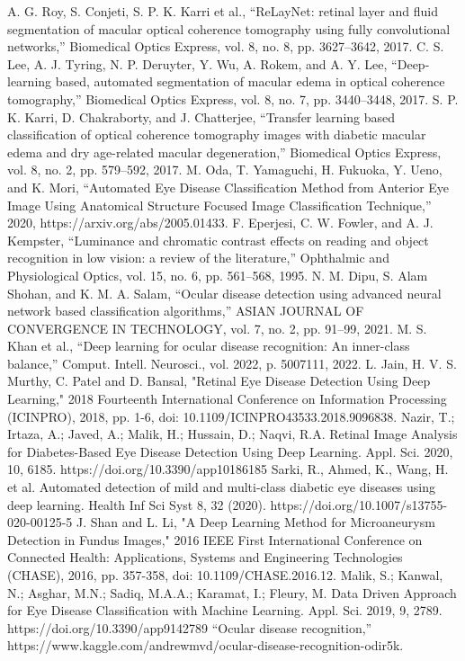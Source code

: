 \documentclass[12pt,a4paper,twoside,openright]{report}
\begin{document}
\begin{thebibliography}{00}
A. G. Roy, S. Conjeti, S. P. K. Karri et al., “ReLayNet: retinal layer and fluid segmentation of macular optical coherence tomography using fully convolutional networks,” Biomedical Optics Express, vol. 8, no. 8, pp. 3627–3642, 2017.
C. S. Lee, A. J. Tyring, N. P. Deruyter, Y. Wu, A. Rokem, and A. Y. Lee, “Deep-learning based, automated segmentation of macular edema in optical coherence tomography,” Biomedical Optics Express, vol. 8, no. 7, pp. 3440–3448, 2017.
S. P. K. Karri, D. Chakraborty, and J. Chatterjee, “Transfer learning based classification of optical coherence tomography images with diabetic macular edema and dry age-related macular degeneration,” Biomedical Optics Express, vol. 8, no. 2, pp. 579–592, 2017.
M. Oda, T. Yamaguchi, H. Fukuoka, Y. Ueno, and K. Mori, “Automated Eye Disease Classification Method from Anterior Eye Image Using Anatomical Structure Focused Image Classification Technique,” 2020, https://arxiv.org/abs/2005.01433.
F. Eperjesi, C. W. Fowler, and A. J. Kempster, “Luminance and chromatic contrast effects on reading and object recognition in low vision: a review of the literature,” Ophthalmic and Physiological Optics, vol. 15, no. 6, pp. 561–568, 1995.
N. M. Dipu, S. Alam Shohan, and K. M. A. Salam, “Ocular disease detection using advanced neural network based classification algorithms,” ASIAN JOURNAL OF CONVERGENCE IN TECHNOLOGY, vol. 7, no. 2, pp. 91–99, 2021.
M. S. Khan et al., “Deep learning for ocular disease recognition: An inner-class balance,” Comput. Intell. Neurosci., vol. 2022, p. 5007111, 2022.
 L. Jain, H. V. S. Murthy, C. Patel and D. Bansal, "Retinal Eye Disease Detection Using Deep Learning," 2018 Fourteenth International Conference on Information Processing (ICINPRO), 2018, pp. 1-6, doi: 10.1109/ICINPRO43533.2018.9096838.
 Nazir, T.; Irtaza, A.; Javed, A.; Malik, H.; Hussain, D.; Naqvi, R.A. Retinal Image Analysis for Diabetes-Based Eye Disease Detection Using Deep Learning. Appl. Sci. 2020, 10, 6185. https://doi.org/10.3390/app10186185
Sarki, R., Ahmed, K., Wang, H. et al. Automated detection of mild and multi-class diabetic eye diseases using deep learning. Health Inf Sci Syst 8, 32 (2020). https://doi.org/10.1007/s13755-020-00125-5
 J. Shan and L. Li, "A Deep Learning Method for Microaneurysm Detection in Fundus Images," 2016 IEEE First International Conference on Connected Health: Applications, Systems and Engineering Technologies (CHASE), 2016, pp. 357-358, doi: 10.1109/CHASE.2016.12.
 Malik, S.; Kanwal, N.; Asghar, M.N.; Sadiq, M.A.A.; Karamat, I.; Fleury, M. Data Driven Approach for Eye Disease Classification with Machine Learning. Appl. Sci. 2019, 9, 2789. https://doi.org/10.3390/app9142789
 “Ocular disease recognition,” https://www.kaggle.com/andrewmvd/ocular-disease-recognition-odir5k.
\end{thebibliography}
\vspace{12pt}
\end{document}
